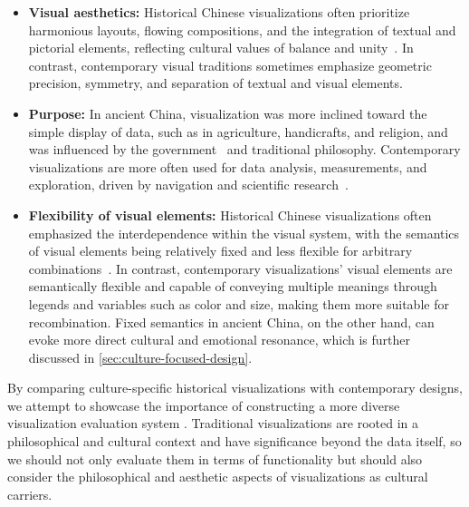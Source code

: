 \begin{itemize}[leftmargin=3.5mm]
    \item \textbf{Visual aesthetics:} Historical Chinese visualizations often prioritize harmonious layouts, flowing compositions, and the integration of textual and pictorial elements, reflecting cultural values of balance and unity~\cite{Baur2020Visual}. 
    In contrast, contemporary visual traditions sometimes emphasize geometric precision, symmetry, and separation of textual and visual elements.
    
    \item \textbf{Purpose:} In ancient China, visualization was more inclined toward the simple display of data, such as in agriculture, handicrafts, and religion, and was influenced by the government~\cite{Yee1994Reinterpreting} and traditional philosophy. 
    Contemporary visualizations are more often used for data analysis, measurements, and exploration, driven by navigation and scientific research~\cite{Baur2020Visual}.

    \item \textbf{Flexibility of visual elements:} Historical Chinese visualizations often emphasized the interdependence within the visual system, with the semantics of visual elements being relatively fixed and less flexible for arbitrary combinations~\cite{Baur2020Visual}. 
    In contrast, contemporary visualizations' visual elements are semantically flexible and capable of conveying multiple meanings through legends and variables such as color and size, making them more suitable for recombination.
    Fixed semantics in ancient China, on the other hand, can evoke more direct cultural and emotional resonance, which is further discussed in \cref{sec:culture-focused-design}.
\end{itemize}

By comparing culture-specific historical visualizations with contemporary designs, we attempt to showcase the importance of constructing a more diverse visualization evaluation system . 
Traditional visualizations are rooted in a philosophical and cultural context and have significance beyond the data itself, so we should not only evaluate them in terms of functionality but should also consider the philosophical and aesthetic aspects of visualizations as cultural carriers.



